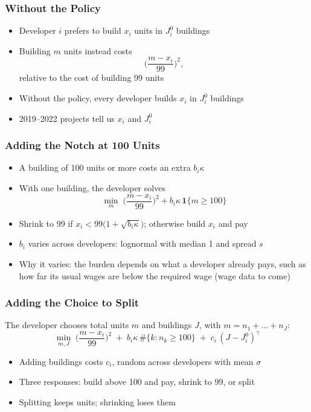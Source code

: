 \begin{frame}
    \frametitle{Without the Policy}
    \begin{itemize}[itemsep=0.5em]
        \item Developer $i$ prefers to build $x_i$ units in $J_i^0$ buildings
        \item Building $m$ units instead costs
        \[
          \Big(\frac{m-x_i}{99}\Big)^2,
        \]
        relative to the cost of building 99 units
        \item Without the policy, every developer builds $x_i$ in $J_i^0$ buildings
        \item 2019--2022 projects tell us $x_i$ and $J_i^0$
    \end{itemize}
\end{frame}

\begin{frame}
    \frametitle{Adding the Notch at 100 Units}
    \begin{itemize}[itemsep=0.5em]
        \item A building of 100 units or more costs an extra $b_i\kappa$
        \item With one building, the developer solves
        \[
          \min_m\; \Big(\frac{m-x_i}{99}\Big)^2 + b_i\kappa\,\mathbf{1}\{m\ge100\}
        \]
        \item Shrink to 99 if $x_i < 99\big(1+\sqrt{b_i\kappa}\big)$; otherwise build $x_i$ and pay
        \item $b_i$ varies across developers: lognormal with median 1 and spread $s$
        \item Why it varies: the burden depends on what a developer already pays, such as how far its usual wages are below the required wage (wage data to come)
    \end{itemize}
\end{frame}

\begin{frame}
    \frametitle{Adding the Choice to Split}
    The developer chooses total units $m$ and buildings $J$, with $m=n_1+\dots+n_J$:
    \[
      \min_{m,J}\; \Big(\frac{m-x_i}{99}\Big)^2
      \;+\; b_i\kappa\,\#\{k: n_k\ge100\}
      \;+\; c_i\,(J-J_i^0)^{\gamma}
    \]
    \begin{itemize}[itemsep=0.4em]
        \item Adding buildings costs $c_i$, random across developers with mean $\sigma$
        \item Three responses: build above 100 and pay, shrink to 99, or split
        \item Splitting keeps units; shrinking loses them
    \end{itemize}
\end{frame}

